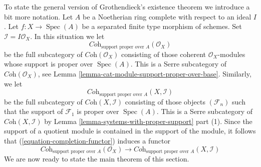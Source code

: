 \documentclass[10pt,a4paper]{amsart}
\theoremstyle{plain}
\theoremstyle{definition}
\theoremstyle{remark}
\numberwithin{equation}{subsection}
\def\Spec{\mathop{\mathrm{Spec}}}
\begin{document}
\noindent
To state the general version of Grothendieck's existence theorem
we introduce a bit more notation. Let $A$ be a Noetherian ring
complete with respect to an ideal $I$. Let $f : X \to \Spec(A)$
be a separated finite type morphism of schemes. Set
$\mathcal{I} = I\mathcal{O}_X$. In this situation we let
$$
\textit{Coh}_{\text{support proper over } A}(\mathcal{O}_X)
$$
be the full subcategory of $\textit{Coh}(\mathcal{O}_X)$
consisting of those coherent $\mathcal{O}_X$-modules whose
support is proper over $\Spec(A)$. This is a Serre subcategory of
$\textit{Coh}(\mathcal{O}_X)$, see
Lemma \ref{lemma-cat-module-support-proper-over-base}.
Similarly, we let
$$
\textit{Coh}_{\text{support proper over } A}(X, \mathcal{I})
$$
be the full subcategory of $\textit{Coh}(X, \mathcal{I})$
consisting of those objects $(\mathcal{F}_n)$ such that
the support of $\mathcal{F}_1$ is proper over $\Spec(A)$.
This is a Serre subcategory of $\textit{Coh}(X, \mathcal{I})$
by Lemma \ref{lemma-systems-with-proper-support} part (1).
Since the support of a quotient module is contained in the support
of the module, it follows that (\ref{equation-completion-functor})
induces a functor
\begin{equation}
\label{equation-completion-functor-proper-over-A}
\textit{Coh}_{\text{support proper over }A}(\mathcal{O}_X)
\longrightarrow
\textit{Coh}_{\text{support proper over }A}(X, \mathcal{I})
\end{equation}
We are now ready to state the main theorem of this section.
\end{document}
